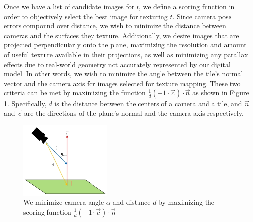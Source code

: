\documentclass[]{spie}  %
\begin{document}
Once we have a list of candidate images for $t$, we define a scoring
function in order to objectively select the best image for texturing
$t$. Since camera pose errors compound over distance, we wish to
minimize the distance between cameras and the surfaces they
texture. Additionally, we desire images that are projected
perpendicularly onto the plane, maximizing the resolution and amount
of useful texture available in their projections, as well as
minimizing any parallax effects due to real-world geometry not
accurately represented by our digital model. In other words, we wish
to minimize the angle between the tile's normal vector and the camera
axis for images selected for texture mapping. These two criteria can
be met by maximizing the function $\frac{1}{d} (-1 \cdot \vec{c})
\cdot \vec{n}$ as shown in Figure
\ref{fig:scoringFunction}. Specifically, $d$ is the distance between
the centers of a camera and a tile, and $\vec{n}$ and $\vec{c}$ are
the directions of the plane's normal and the camera axis respectively.

\begin{figure}
  \centering
  \includegraphics[height=1.5in]{scoringFunction.jpg}
  \caption{We minimize camera angle $\alpha$ and distance $d$ by
    maximizing the scoring function $\frac{1}{d} (-1 \cdot \vec{c})
    \cdot \vec{n}$}
  \label{fig:scoringFunction}
\end{figure}
\end{document}
